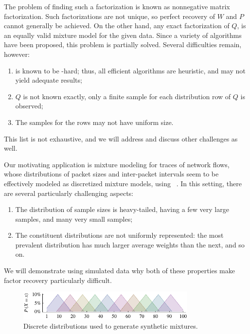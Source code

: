 \documentclass[conference]{IEEEtran}
\begin{document}
The problem of finding such a factorization is known as nonnegative matrix factorization.
Such factorizations are not unique, so perfect recovery of $W$ and $P$ cannot generally be achieved.
On the other hand, any exact factorization of $Q$, is an equally valid mixture model for the given data.
Since a variety of  algorithms have been proposed, this problem is partially solved.
Several difficulties remain, however:
\begin{enumerate}
  \item {} is known to be -hard; thus, all efficient algorithms are heuristic, and may not yield adequate results;
  \item $Q$ is not known exactly, only a finite sample for each distribution row of $Q$ is observed;
  \item The samples for the rows may not have uniform size.
\end{enumerate}
This list is not exhaustive, and we will address and discuss other challenges as well.

Our motivating application is mixture modeling for traces of network flows, whose distributions of packet sizes and inter-packet intervals seem to be effectively modeled as discretized mixture models, using ~\cite{Karpinski08}.
In this setting, there are several particularly challenging aspects:
\begin{enumerate}
  \item The distribution of sample sizes is heavy-tailed, having a few very large samples, and many very small samples;
  \item The constituent distributions are not uniformly represented: the most prevalent distribution has much larger average weights than the next, and so on.
\end{enumerate}
We will demonstrate using simulated data why both of these properties make factor recovery particularly difficult.

\begin{figure}[b]
\begin{center}
\includegraphics[width=3.5in]{synth/test}
\end{center}
\vspace{-0.7em}
\caption{Discrete distributions used to generate synthetic mixtures.}
\vspace{-0.5em}
\end{figure}
\end{document}
